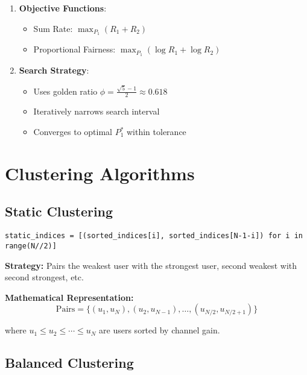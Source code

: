 \documentclass[11pt,a4paper]{article}
\begin{document}
\begin{enumerate}
    \item \textbf{Objective Functions}:
    \begin{itemize}
        \item Sum Rate: $\max_{P_1} (R_1 + R_2)$
        \item Proportional Fairness: $\max_{P_1} (\log R_1 + \log R_2)$
    \end{itemize}
    
    \item \textbf{Search Strategy}:
    \begin{itemize}
        \item Uses golden ratio $\phi = \frac{\sqrt{5}-1}{2} \approx 0.618$
        \item Iteratively narrows search interval
        \item Converges to optimal $P_1^*$ within tolerance
    \end{itemize}
\end{enumerate}

\section{Clustering Algorithms}

\subsection{Static Clustering}

\begin{lstlisting}[caption={Static Clustering Implementation}]
static_indices = [(sorted_indices[i], sorted_indices[N-1-i]) for i in range(N//2)]
\end{lstlisting}

\textbf{Strategy:} Pairs the weakest user with the strongest user, second weakest with second strongest, etc.

\textbf{Mathematical Representation:}
\begin{equation}
\text{Pairs} = \{(u_1, u_N), (u_2, u_{N-1}), \ldots, (u_{N/2}, u_{N/2+1})\}
\end{equation}

where $u_1 \leq u_2 \leq \cdots \leq u_N$ are users sorted by channel gain.

\subsection{Balanced Clustering}
\end{document}
